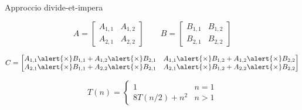 \begin{frame}{Approccio divide-et-impera}

\small
{}

\[
A = 
\begin{bmatrix} 
A_{1,1} & A_{1,2}\\	
A_{2,1} & A_{2,2} 
\end{bmatrix}
\qquad
B = 
\begin{bmatrix} 
B_{1,1} & B_{1,2}\\	
B_{2,1} & B_{2,2} 
\end{bmatrix}
\]

\medskip
{}

\[
C = 
\begin{bmatrix} 
A_{1,1} \alert{\times} B_{1,1} + A_{1,2} \alert{\times} B_{2,1} & A_{1,1} \alert{\times} B_{1,2} + A_{1,2} \alert{\times} B_{2,2} \\
A_{2,1} \alert{\times} B_{1,1} + A_{2,2} \alert{\times} B_{2,1} & A_{2,1} \alert{\times} B_{1,2} + A_{2,2} \alert{\times} B_{2,2} \\
\end{bmatrix}
\]

\medskip
{}

\[
T(n) = \left\{ 
  \begin{array}{ll}
     1 & n = 1\\
     8T(n/2) + n^2  & n > 1 
  \end{array} 
\right.
\]

\end{frame}

